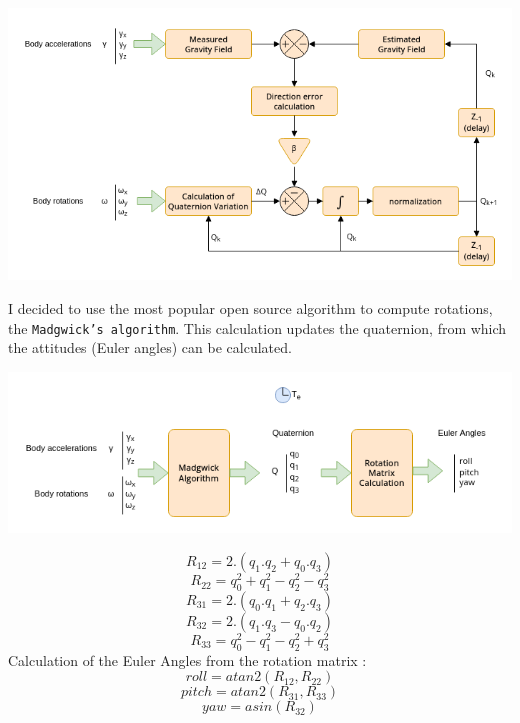 \begin{center}
    \includegraphics[width=0.9\linewidth]{./projects/pmodnav/madgwick.png}
\end{center}
I decided to use the most popular open source algorithm to compute rotations, the \texttt{Madgwick's algorithm}. This calculation updates the quaternion, from which the attitudes (Euler angles) can be calculated.
\begin{center}
    \includegraphics[width=0.9\linewidth]{./projects/pmodnav/madgwick_applied.png}
\end{center}
$$ R_{12} = 2.(q_1.q_2+q_0.q_3) $$
$$ R_{22} = q_0^2+q_1^2-q_2^2-q_3^2 $$
$$ R_{31} = 2.(q_0.q_1+q_2.q_3) $$
$$ R_{32} = 2.(q_1.q_3-q_0.q_2) $$
$$ R_{33} = q_0^2-q_1^2-q_2^2+q_3^2 $$
Calculation of the Euler Angles from the rotation matrix :
$$ roll = atan2(R_{12},R_{22}) $$
$$ pitch = atan2(R_{31},R_{33}) $$
$$ yaw = asin(R_{32}) $$


